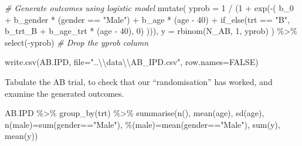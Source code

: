 \documentclass[
]{article}
\newenvironment{Shaded}{\begin{snugshade}}{\end{snugshade}}
\newcommand{\AttributeTok}[1]{\textcolor[rgb]{0.77,0.63,0.00}{#1}}
\newcommand{\CommentTok}[1]{\textcolor[rgb]{0.56,0.35,0.01}{\textit{#1}}}
\newcommand{\ConstantTok}[1]{\textcolor[rgb]{0.00,0.00,0.00}{#1}}
\newcommand{\DecValTok}[1]{\textcolor[rgb]{0.00,0.00,0.81}{#1}}
\newcommand{\FunctionTok}[1]{\textcolor[rgb]{0.00,0.00,0.00}{#1}}
\newcommand{\NormalTok}[1]{#1}
\newcommand{\OtherTok}[1]{\textcolor[rgb]{0.56,0.35,0.01}{#1}}
\newcommand{\SpecialCharTok}[1]{\textcolor[rgb]{0.00,0.00,0.00}{#1}}
\newcommand{\StringTok}[1]{\textcolor[rgb]{0.31,0.60,0.02}{#1}}
\begin{document}
\begin{Shaded}
\begin{Highlighting}[]
  \CommentTok{\# Generate outcomes using logistic model}
  \FunctionTok{mutate}\NormalTok{(}
    \AttributeTok{yprob =} \DecValTok{1} \SpecialCharTok{/}\NormalTok{ (}\DecValTok{1} \SpecialCharTok{+} \FunctionTok{exp}\NormalTok{(}\SpecialCharTok{{-}}\NormalTok{(}
\NormalTok{      b\_0 }\SpecialCharTok{+}\NormalTok{ b\_gender }\SpecialCharTok{*}\NormalTok{ (gender }\SpecialCharTok{==} \StringTok{"Male"}\NormalTok{) }\SpecialCharTok{+}\NormalTok{ b\_age }\SpecialCharTok{*}\NormalTok{ (age }\SpecialCharTok{{-}} \DecValTok{40}\NormalTok{) }\SpecialCharTok{+}
        \FunctionTok{if\_else}\NormalTok{(trt }\SpecialCharTok{==} \StringTok{"B"}\NormalTok{, b\_trt\_B }\SpecialCharTok{+}\NormalTok{ b\_age\_trt }\SpecialCharTok{*}\NormalTok{ (age }\SpecialCharTok{{-}} \DecValTok{40}\NormalTok{), }\DecValTok{0}\NormalTok{)}
\NormalTok{    ))),}
    \AttributeTok{y =} \FunctionTok{rbinom}\NormalTok{(N\_AB, }\DecValTok{1}\NormalTok{, yprob)}
\NormalTok{  ) }\SpecialCharTok{\%\textgreater{}\%}
  \FunctionTok{select}\NormalTok{(}\SpecialCharTok{{-}}\NormalTok{yprob) }\CommentTok{\# Drop the yprob column}

\FunctionTok{write.csv}\NormalTok{(AB.IPD, }\AttributeTok{file=}\StringTok{"..}\SpecialCharTok{\textbackslash{}\textbackslash{}}\StringTok{data}\SpecialCharTok{\textbackslash{}\textbackslash{}}\StringTok{AB\_IPD.csv"}\NormalTok{, }\AttributeTok{row.names=}\ConstantTok{FALSE}\NormalTok{)}
\end{Highlighting}
\end{Shaded}

Tabulate the AB trial, to check that our ``randomisation'' has worked,
and examine the generated outcomes.

\begin{Shaded}
\begin{Highlighting}[]
\NormalTok{AB.IPD }\SpecialCharTok{\%\textgreater{}\%} \FunctionTok{group\_by}\NormalTok{(trt) }\SpecialCharTok{\%\textgreater{}\%}
  \FunctionTok{summarise}\NormalTok{(}\FunctionTok{n}\NormalTok{(), }\FunctionTok{mean}\NormalTok{(age), }\FunctionTok{sd}\NormalTok{(age), }\StringTok{\textasciigrave{}}\AttributeTok{n(male)}\StringTok{\textasciigrave{}}\OtherTok{=}\FunctionTok{sum}\NormalTok{(gender}\SpecialCharTok{==}\StringTok{"Male"}\NormalTok{),}
            \StringTok{\textasciigrave{}}\AttributeTok{\%(male)}\StringTok{\textasciigrave{}}\OtherTok{=}\FunctionTok{mean}\NormalTok{(gender}\SpecialCharTok{==}\StringTok{"Male"}\NormalTok{), }\FunctionTok{sum}\NormalTok{(y), }\FunctionTok{mean}\NormalTok{(y))}
\end{Highlighting}
\end{Shaded}
\end{document}
